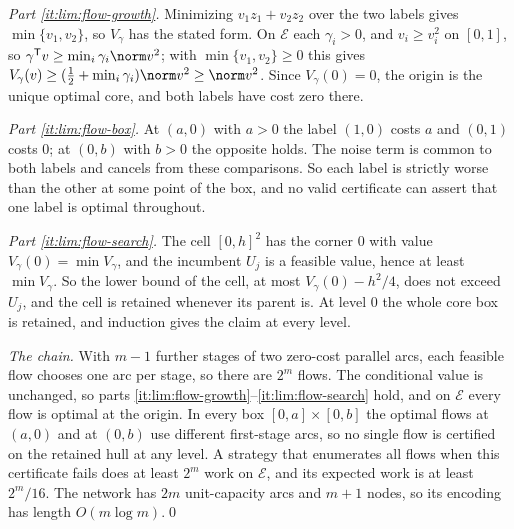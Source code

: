 \emph{Part \ref{it:lim:flow-growth}.} Minimizing $v_1z_1+v_2z_2$ over the
two labels gives $\min\{v_1,v_2\}$, so $V_\gamma$ has the stated form. On
$\mathcal E$ each $\gamma_i>0$, and $v_i\ge v_i^2$ on $[0,1]$, so
$\gamma^{\mathsf T}v\ge\min_i\gamma_i\norm v^2$; with $\min\{v_1,v_2\}\ge0$
this gives $V_\gamma(v)\ge(\frac12+\min_i\gamma_i)\norm v^2\ge\norm v^2$.
Since $V_\gamma(0)=0$, the origin is the unique optimal core, and both
labels have cost zero there.

\emph{Part \ref{it:lim:flow-box}.} At $(a,0)$ with $a>0$ the label $(1,0)$
costs $a$ and $(0,1)$ costs $0$; at $(0,b)$ with $b>0$ the opposite holds.
The noise term is common to both labels and cancels from these comparisons.
So each label is strictly worse than the other at some point of the box,
and no valid certificate can assert that one label is optimal throughout.

\emph{Part \ref{it:lim:flow-search}.} The cell $[0,h]^2$ has the corner $0$
with value $V_\gamma(0)=\min V_\gamma$, and the incumbent $U_j$ is a
feasible value, hence at least $\min V_\gamma$. So the lower bound of the
cell, at most $V_\gamma(0)-h^2/4$, does not exceed $U_j$, and the cell is
retained whenever its parent is. At level $0$ the whole core box is
retained, and induction gives the claim at every level.

\emph{The chain.} With $m-1$ further stages of two zero-cost parallel arcs,
each feasible flow chooses one arc per stage, so there are $2^m$ flows. The
conditional value is unchanged, so parts
\ref{it:lim:flow-growth}--\ref{it:lim:flow-search} hold, and on
$\mathcal E$ every flow is optimal at the origin. In every box
$[0,a]\times[0,b]$ the optimal flows at $(a,0)$ and at $(0,b)$ use
different first-stage arcs, so no single flow is certified on the retained
hull at any level. A strategy that enumerates all flows when this
certificate fails does at least $2^m$ work on $\mathcal E$, and its
expected work is at least $2^m/16$. The network has $2m$ unit-capacity arcs
and $m+1$ nodes, so its encoding has length $O(m\log m)$.\qed
